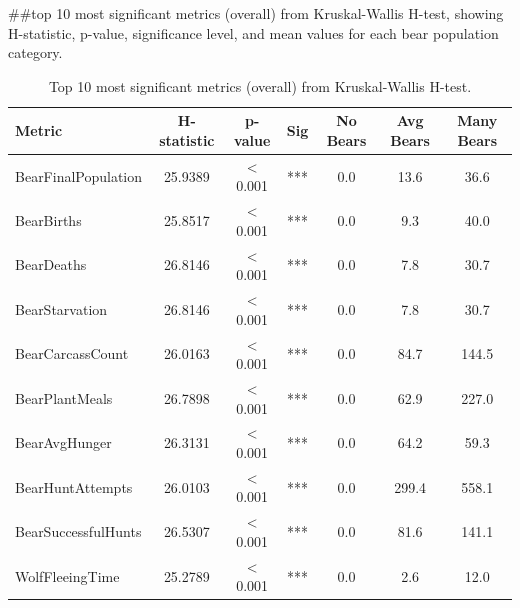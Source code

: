 
##top 10 most significant metrics (overall) from Kruskal-Wallis H-test, showing H-statistic, p-value, significance level, and mean values for each bear population category.

\begin{table}[htbp]
\centering
\caption{Top 10 most significant metrics (overall) from Kruskal-Wallis H-test.}
\label{tab:significance_top10_overall}
\small
\begin{tabular}{lcccccc}
\toprule
\textbf{Metric} & \textbf{H-statistic} & \textbf{p-value} & \textbf{Sig} & \textbf{No Bears} & \textbf{Avg Bears} & \textbf{Many Bears} \\
\midrule
BearFinalPopulation & 25.9389 & < 0.001 & *** & 0.0 & 13.6 & 36.6 \\
BearBirths & 25.8517 & < 0.001 & *** & 0.0 & 9.3 & 40.0 \\
BearDeaths & 26.8146 & < 0.001 & *** & 0.0 & 7.8 & 30.7 \\
BearStarvation & 26.8146 & < 0.001 & *** & 0.0 & 7.8 & 30.7 \\
BearCarcassCount & 26.0163 & < 0.001 & *** & 0.0 & 84.7 & 144.5 \\
BearPlantMeals & 26.7898 & < 0.001 & *** & 0.0 & 62.9 & 227.0 \\
BearAvgHunger & 26.3131 & < 0.001 & *** & 0.0 & 64.2 & 59.3 \\
BearHuntAttempts & 26.0103 & < 0.001 & *** & 0.0 & 299.4 & 558.1 \\
BearSuccessfulHunts & 26.5307 & < 0.001 & *** & 0.0 & 81.6 & 141.1 \\
WolfFleeingTime & 25.2789 & < 0.001 & *** & 0.0 & 2.6 & 12.0 \\
\bottomrule
\end{tabular}
\end{table}
